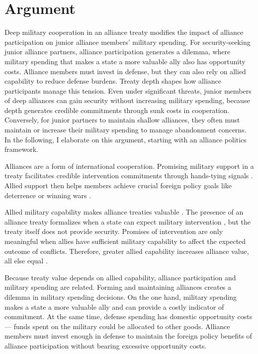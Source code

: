 \documentclass[12pt]{article}
\begin{document}
\section{Argument}

Deep military cooperation in an alliance treaty modifies the impact of alliance participation on junior alliance members' military spending.
For security-seeking junior alliance partners, alliance participation generates a dilemma, where military spending that makes a state a more valuable ally also has opportunity costs. 
Alliance members must invest in defense, but they can also rely on allied capability to reduce defense burdens. 
Treaty depth shapes how alliance participants manage this tension. 
Even under significant threats, junior members of deep alliances can gain security without increasing military spending, because depth generates credible commitments through sunk costs in cooperation. 
Conversely, for junior partners to maintain shallow alliances, they often must maintain or increase their military spending to manage abandonment concerns. 
In the following, I elaborate on this argument, starting with an alliance politics framework. 


Alliances are a form of international cooperation. 
Promising military support in a treaty facilitates credible intervention commitments through hands-tying signals \citep{Fearon1997, Morrow2000}. 
Allied support then helps members achieve crucial foreign policy goals like deterrence or winning wars \citep{Walt1990, Snyder1997}. 


Allied military capability makes alliance treaties valuable \citep{FordhamPoast2014}. 
The presence of an alliance treaty formalizes when a state can expect military intervention \citep{Morrow2000}, but the treaty itself does not provide security. 
Promises of intervention are only meaningful when allies have sufficient military capability to affect the expected outcome of conflicts.  
Therefore, greater allied capability increases alliance value, all else equal \citep{Johnsonetal2015}.


Because treaty value depends on allied capability, alliance participation and military spending are related. 
Forming and maintaining alliances creates a dilemma in military spending decisions. 
On the one hand, military spending makes a state a more valuable ally and can provide a costly indicator of commitment. 
At the same time, defense spending has domestic opportunity costs--- funds spent on the military could be allocated to other goods. 
Alliance members must invest enough in defense to maintain the foreign policy benefits of alliance participation without bearing excessive opportunity costs. 
\end{document}
